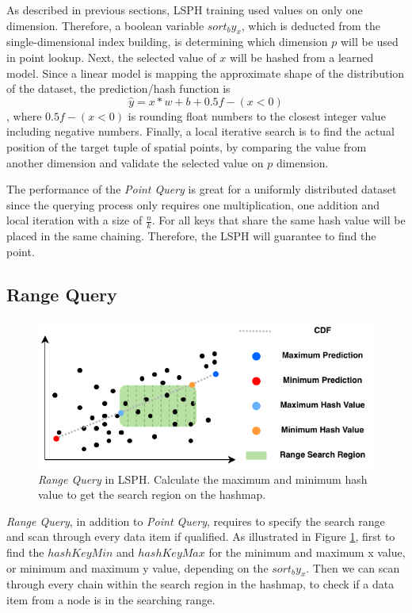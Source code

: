 As described in previous sections, LSPH training used values on only one dimension. Therefore, a boolean variable $sort_by_x$, which is deducted from the single-dimensional index building,  is determining which dimension $p$ will be used in point lookup. Next, the selected value of $x$ will be hashed from a learned model. Since a linear model is mapping the approximate shape of the distribution of the dataset, the prediction/hash function is 
\begin{equation}
\hat{y} = x * w + b + 0.5f - (x<0)
\end{equation}
, where $0.5f - (x<0)$ is rounding float numbers to the closest integer value including negative numbers. Finally, a local iterative search is to find the actual position of the target tuple of spatial points, by comparing the value from another dimension and validate the selected value on $p$ dimension. 

The performance of the \textit{Point Query} is great for a uniformly distributed dataset since the querying process only requires one multiplication, one addition and local iteration with a size of  $\frac{n}{k}$. For all keys that share the same hash value will be placed in the same chaining. Therefore, the LSPH will guarantee to find the point. 


\subsection{Range Query}

\begin{figure}[ht]
\centering
\includegraphics[scale=1]{Figures/range_search.pdf}
\caption{\textit{Range Query} in LSPH. Calculate the maximum and minimum hash value to get the search region on the hashmap.}
\label{fig:range_search}
\end{figure}


\textit{Range Query}, in addition to \textit{Point Query}, requires to specify the search range and scan through every data item if qualified. As illustrated in Figure \ref{fig:range_search}, first to find the $hashKeyMin$ and $hashKeyMax$ for the minimum and maximum x value, or minimum and maximum y value, depending on the $sort_by_x$. Then we can scan through every chain within the search region in the hashmap, to check if a data item from a node is in the searching range.


